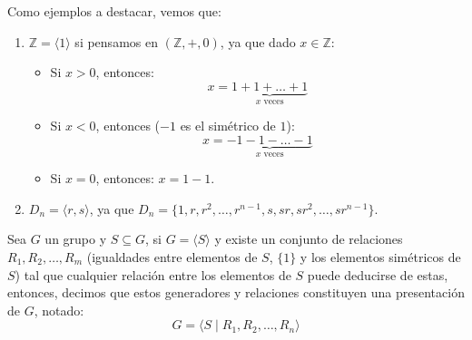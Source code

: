 \begin{ejemplo}
    Como ejemplos a destacar, vemos que:
    \begin{enumerate}
        \item $\mathbb{Z} = \langle 1 \rangle $ si pensamos en $(\mathbb{Z}, +, 0)$, ya que dado $x\in \mathbb{Z}$:
            \begin{itemize}
                \item Si $x>0$, entonces:
                    \begin{equation*}
                        x = \underbrace{1+1+\ldots +1}_{x \text{\ veces}}
                    \end{equation*}
                \item Si $x<0$, entonces ($-1$ es el simétrico de $1$):
                    \begin{equation*}
                        x = \underbrace{-1-1-\ldots-1}_{x \text{\ veces}}
                    \end{equation*}
                \item Si $x=0$, entonces: $x = 1 - 1$.
            \end{itemize}
        \item $D_n = \langle r,s \rangle $, ya que $D_n = \{1, r, r^2, \ldots, r^{n-1}, s, sr, sr^2, \ldots, sr^{n-1}\}$.
    \end{enumerate}
\end{ejemplo}

\begin{definicion}
    Sea $G$ un grupo y $S\subseteq G$, si $G=\langle S \rangle $ y existe un conjunto de relaciones $R_1,R_2,\ldots,R_m$ (igualdades entre elementos de $S$, $\{1\}$ y los elementos simétricos de $S$) tal que cualquier relación entre los elementos de $S$ puede deducirse de estas, entonces, decimos que estos generadores y relaciones constituyen una presentación de $G$, notado:
    \begin{equation*}
        G=\langle S \mid R_1,R_2,\ldots, R_n \rangle 
    \end{equation*}
\end{definicion}

